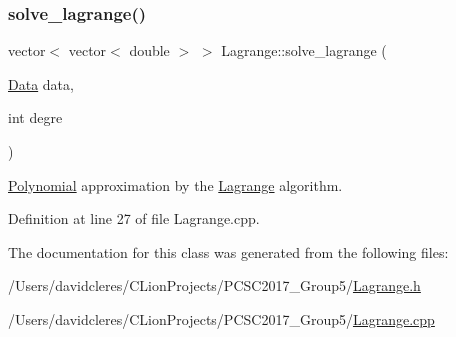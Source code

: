 \subsubsection{\texorpdfstring{solve\+\_\+lagrange()}{solve\_lagrange()}}
{\footnotesize\ttfamily vector$<$ vector$<$ double $>$ $>$ Lagrange\+::solve\+\_\+lagrange (\begin{DoxyParamCaption}\item[{\mbox{\hyperlink{struct_data}{Data}}}]{data,  }\item[{int}]{degre }\end{DoxyParamCaption})}



\mbox{\hyperlink{class_polynomial}{Polynomial}} approximation by the \mbox{\hyperlink{class_lagrange}{Lagrange}} algorithm. 



Definition at line 27 of file Lagrange.\+cpp.



The documentation for this class was generated from the following files\+:\begin{DoxyCompactItemize}
\item 
/\+Users/davidcleres/\+C\+Lion\+Projects/\+P\+C\+S\+C2017\+\_\+\+Group5/\mbox{\hyperlink{_lagrange_8h}{Lagrange.\+h}}\item 
/\+Users/davidcleres/\+C\+Lion\+Projects/\+P\+C\+S\+C2017\+\_\+\+Group5/\mbox{\hyperlink{_lagrange_8cpp}{Lagrange.\+cpp}}\end{DoxyCompactItemize}
